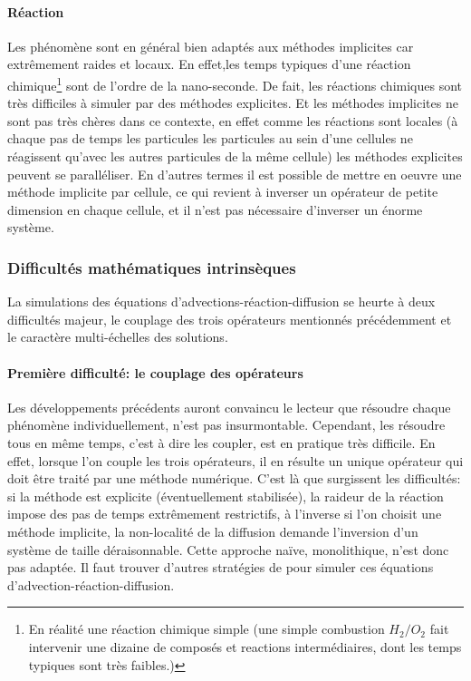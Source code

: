 \paragraph{Réaction}
    Les phénomène sont en général bien adaptés aux méthodes implicites car extrêmement raides et locaux.
    En effet,les temps typiques d'une réaction chimique\footnote{
    En réalité une réaction chimique simple (une simple combustion $H_2/O_2$ fait intervenir une dizaine de composés et reactions intermédiaires, dont les temps typiques sont très faibles.)} sont de l'ordre de la nano-seconde.
    De fait, les réactions chimiques sont très difficiles à simuler par des méthodes explicites.
    Et les méthodes implicites ne sont pas très chères dans ce contexte, en effet comme les réactions sont locales 
    (à chaque pas de temps les particules les particules au sein d'une cellules ne réagissent qu'avec les autres particules de la même cellule)
    les méthodes explicites peuvent se paralléliser. En d'autres termes il est possible de mettre en oeuvre une méthode implicite par cellule,
    ce qui revient à inverser un opérateur de petite dimension en chaque cellule, et il n'est pas nécessaire d'inverser un énorme système.

\subsubsection{Difficultés mathématiques intrinsèques}
    La simulations des équations d'advections-réaction-diffusion se heurte à deux difficultés majeur, le couplage des trois opérateurs mentionnés précédemment
    et le caractère multi-échelles des solutions.

    \paragraph{Première difficulté: le couplage des opérateurs}
        Les développements précédents auront convaincu le lecteur que résoudre chaque phénomène individuellement, n'est pas insurmontable. 
        Cependant, les résoudre tous en même temps, c'est à dire les coupler, est en pratique très difficile.
        En effet, lorsque l'on couple les trois opérateurs, il en résulte un unique opérateur qui doit être traité par une méthode numérique.
        C'est là que surgissent les difficultés: si la méthode est explicite (éventuellement stabilisée), la raideur de la réaction impose des pas de temps extrêmement restrictifs,
        à l'inverse si l'on choisit une méthode implicite, la non-localité de la diffusion demande l'inversion d'un système de taille déraisonnable. 
        Cette approche naïve, monolithique, n'est donc pas adaptée. Il faut trouver d'autres stratégies de pour simuler ces équations d’advection-réaction-diffusion.

